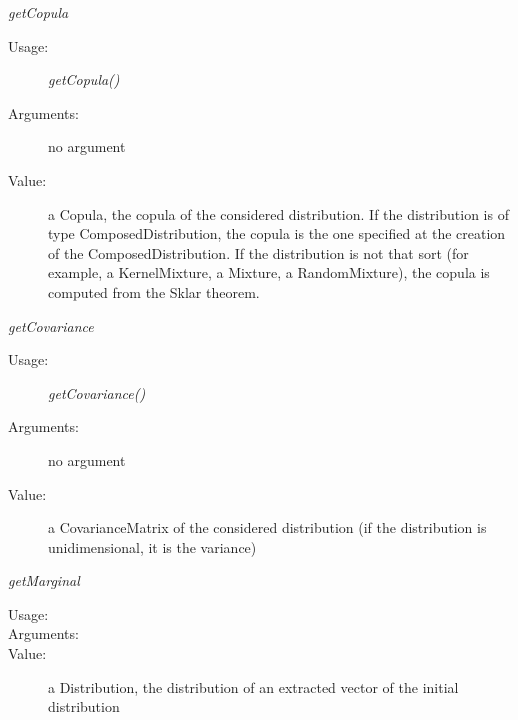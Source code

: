 \begin{description}
\begin{description}
\bigskip

\item \textit{getCopula}
\begin{description}
\item[Usage:] \textit{getCopula()}
\item[Arguments:] no argument
\item[Value:] a Copula, the copula of the considered distribution. If the distribution is of type ComposedDistribution, the copula is the one specified at the creation of the ComposedDistribution. If the distribution is not that sort (for example, a KernelMixture, a Mixture, a RandomMixture), the copula is computed from the Sklar theorem.
\end{description}
\bigskip

\item \textit{getCovariance}
\begin{description}
\item[Usage:] \textit{getCovariance()}
\item[Arguments:] no argument
\item[Value:] a CovarianceMatrix of the considered distribution (if the distribution is unidimensional, it is the variance)
\end{description}
\bigskip

\item \textit{getMarginal}
\begin{description}
\item[Usage:] \rule{0pt}{1em}


\item[Arguments:]  \rule{0pt}{1em}

\item[Value:] a Distribution, the distribution of an extracted vector of the initial distribution
\end{description}
\bigskip


\end{description}
\end{description}
